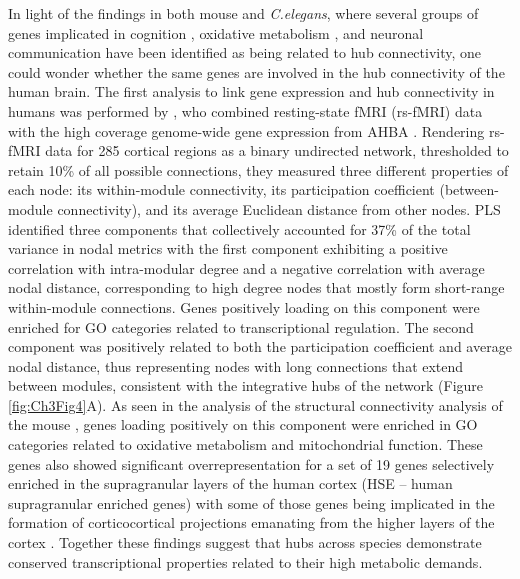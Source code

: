 In light of the findings in both mouse and \textit{C.elegans}, where several groups of genes implicated in cognition \citep{Rubinov2015c}, oxidative metabolism \citep{Fulcher2016}, and neuronal communication \citep{Arnatkeviciute2018} have been identified as being related to hub connectivity, one could wonder whether the same genes are involved in the hub connectivity of the human brain. The first analysis to link gene expression and hub connectivity in humans was performed by \mbox{\citet{Vertes2016b}}, who combined resting-state fMRI (rs-fMRI) data with the high coverage genome-wide gene expression from AHBA \citep{Hawrylycz2012}.
Rendering rs-fMRI data for 285 cortical regions as a binary undirected network, thresholded to retain 10\% of all possible connections, they measured three different properties of each node: its within-module connectivity, its participation coefficient (between-module connectivity), and its average Euclidean distance from other nodes.
PLS identified three components that collectively accounted for 37\% of the total variance in nodal metrics with the first component exhibiting a positive correlation with intra-modular degree and a negative correlation with average nodal distance, corresponding to high degree nodes that mostly form short-range within-module connections. Genes positively loading on this component were enriched for GO categories related to transcriptional regulation. The second component was positively related to both the participation coefficient and average nodal distance, thus representing nodes with long connections that extend between modules, consistent with the integrative hubs of the network (Figure \ref{fig:Ch3Fig4}A).
As seen in the analysis of the structural connectivity analysis of the mouse \mbox{\citep{Fulcher2016}}, genes loading positively on this component were enriched in GO categories related to oxidative metabolism and mitochondrial function.
These genes also showed significant overrepresentation for a set of 19 genes \citep{Krienen2016} selectively enriched in the supragranular layers of the human cortex (HSE – human supragranular enriched genes) with some of those genes being implicated in the formation of corticocortical projections emanating from the higher layers of the cortex \citep{Krienen2016}.
Together these findings suggest that hubs across species demonstrate conserved transcriptional properties related to their high metabolic demands.

